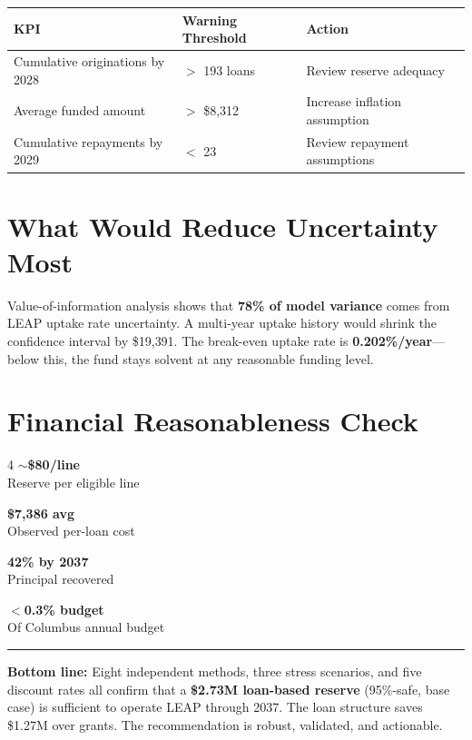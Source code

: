 \documentclass[11pt, letterpaper]{article}
\begin{document}
\begin{center}
\renewcommand{\arraystretch}{1.2}
\small
\begin{tabular}{@{}lll@{}}
\toprule
\textbf{KPI} & \textbf{Warning Threshold} & \textbf{Action} \\
\midrule
Cumulative originations by 2028 & $>$ 193 loans & Review reserve adequacy \\
Average funded amount & $>$ \$8{,}312 & Increase inflation assumption \\
Cumulative repayments by 2029 & $<$ 23 & Review repayment assumptions \\
\bottomrule
\end{tabular}
\end{center}

\vspace{-0.2cm}
\section*{What Would Reduce Uncertainty Most}

Value-of-information analysis shows that \textbf{78\% of model variance} comes from LEAP uptake rate uncertainty. A multi-year uptake history would shrink the confidence interval by \$19{,}391. The break-even uptake rate is \textbf{0.202\%/year}---below this, the fund stays solvent at any reasonable funding level.

\vspace{-0.2cm}
\section*{Financial Reasonableness Check}

\begin{multicols}{4}
\centering
\textbf{$\sim$\$80/line} \\ Reserve per eligible line

\columnbreak
\textbf{\$7{,}386 avg} \\ Observed per-loan cost

\columnbreak
\textbf{42\% by 2037} \\ Principal recovered

\columnbreak
\textbf{$<$0.3\% budget} \\ Of Columbus annual budget
\end{multicols}

\vspace{-0.2cm}
\noindent\rule{\textwidth}{0.4pt}
\vspace{0.1cm}

\noindent \textbf{Bottom line:} Eight independent methods, three stress scenarios, and five discount rates all confirm that a \textbf{\$2.73M loan-based reserve} (95\%-safe, base case) is sufficient to operate LEAP through 2037. The loan structure saves \$1.27M over grants. The recommendation is robust, validated, and actionable.
\end{document}
